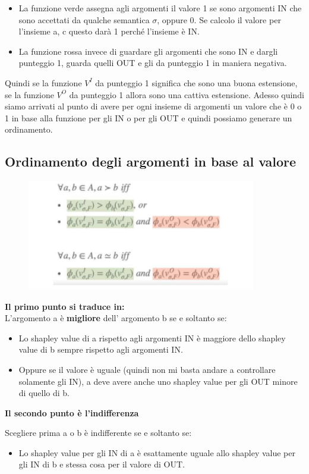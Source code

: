     \begin{itemize}
        \item La funzione verde assegna agli argomenti il valore 1 se sono argomenti IN che sono accettati da qualche semantica $\sigma$, oppure 0. Se calcolo il valore per l'insieme a, c questo darà 1 perché l'insieme è IN.
        \item La funzione rossa invece di guardare gli argomenti che sono IN e dargli punteggio 1, guarda quelli OUT e gli da punteggio 1 in maniera negativa.
    \end{itemize}
    Quindi se la funzione $V^I$ da punteggio 1 significa che sono una buona estensione, se la funzione $V^O$ da punteggio 1 allora sono una cattiva estensione. Adesso quindi siamo arrivati al punto di avere per ogni insieme di argomenti un valore che è 0 o 1 in base alla funzione per gli IN o per gli OUT e quindi possiamo generare un ordinamento.
\subsection{Ordinamento degli argomenti in base al valore}
\begin{figure}[H]
    \centering
    \includegraphics[width=10cm, keepaspectratio]{img/Cap8/ordinamento-valore.png}
\end{figure}
\textbf{Il primo punto si traduce in:}
\\L'argomento a è \textbf{migliore} dell' argomento b se e soltanto se:
\begin{itemize}
    \item Lo shapley value di a rispetto agli argomenti IN è maggiore dello shapley value di b sempre rispetto agli argomenti IN.
    \item Oppure se il valore è uguale (quindi non mi basta andare a controllare solamente gli IN), a deve avere anche uno shapley value per gli OUT minore di quello di b.
\end{itemize}
\begin{center}
    \textbf{Il secondo punto è l'indifferenza}
\end{center}
Scegliere prima a o b è indifferente se e soltanto se:
\begin{itemize}
    \item Lo shapley value per gli IN di a è esattamente uguale allo shapley value per gli IN di b e stessa cosa per il valore di OUT.
\end{itemize}
